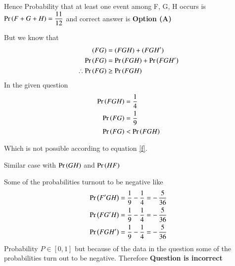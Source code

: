 \documentclass[journal,12pt,twocolumn]{IEEEtran}
\begin{document}
Hence Probability that at least one event among F, G, H occurs is $\Pr\left(F + G + H\right)=\dfrac{11}{12}$ and correct answer is \textbf{Option (A)}
\null \par \null
But we know that 
\begin{align}
(F G) &= (F G H) + (F G {H'}) \\
\Pr\left(F G\right) &= \Pr\left(F G H\right) + \Pr\left(F G {H'}\right) \\
\therefore \Pr\left(F G\right) &\geq \Pr\left(F G H\right) \label{f}
\end{align}
In the given question 
\begin{align}
\Pr\left(F G H\right) &= \dfrac{1}{4} \\
\Pr\left(F G\right)   &= \dfrac{1}{9} \\
\Pr\left(F G \right) &< \Pr\left(F G H\right) 
\end{align}

Which is not possible according to equation \eqref{f}. 

Similar case with $\Pr\left(G H\right)$ and $\Pr\left(H F\right)$ 

Some of the probabilities turnout to be negative like 
\begin{align}
\Pr\left({F'} G H\right)  &= \dfrac{1}{9} - \dfrac{1}{4} = -\,\dfrac{5}{36} \\
\Pr\left(F {G'} H\right)  &= \dfrac{1}{9} - \dfrac{1}{4} = -\,\dfrac{5}{36} \\
\Pr\left(F G {H'}\right)  &= \dfrac{1}{9} - \dfrac{1}{4} = -\,\dfrac{5}{36} 
\end{align}
Probability $P\in [0,1]$ but because of the data in the question some of the probabilities turn out to be negative. Therefore \textbf{Question is incorrect}
\end{document}
